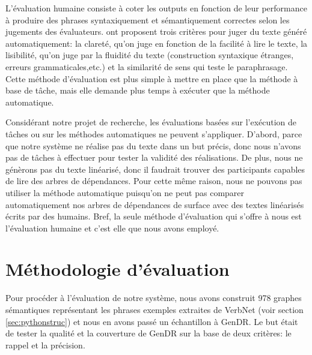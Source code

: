 L'évaluation humaine consiste à coter les outputs en fonction de leur performance à produire des phrases syntaxiquement et sémantiquement correctes selon les jugements des évaluateurs. \cite{BelzFirstSurfaceRealisation2011} ont proposent trois critères pour juger du texte généré automatiquement: la clareté, qu'on juge en fonction de la facilité à lire le texte, la lisibilité, qu'on juge par la fluidité du texte (construction syntaxique étranges, erreurs grammaticales,etc.) et la similarité de sens qui teste le paraphrasage. Cette méthode d'évaluation est plus simple à mettre en place que la méthode à base de tâche, mais elle demande plus temps à exécuter que la méthode automatique.
 
Considérant notre projet de recherche, les évaluations basées sur l'exécution de tâches ou sur les méthodes automatiques ne peuvent s'appliquer. D'abord, parce que notre système ne réalise pas du texte dans un but précis, donc nous n'avons pas de tâches à effectuer pour tester la validité des réalisations. De plus, nous ne génèrons pas du texte linéarisé, donc il faudrait trouver des participants capables de lire des arbres de dépendances. Pour cette même raison, nous ne pouvons pas utiliser la méthode automatique puisqu'on ne peut pas comparer automatiquement nos arbres de dépendances de surface avec des textes linéarisés écrits par des humains. Bref, la seule méthode d'évaluation qui s'offre à nous est l'évaluation humaine et c'est elle que nous avons employé.

\section{Méthodologie d'évaluation}

Pour procéder à l'évaluation de notre système, nous avons construit 978 graphes sémantiques représentant les phrases exemples extraites de VerbNet (voir section \ref{sec:pythonstruc}) et nous en avons passé un échantillon à GenDR. Le but était de tester la qualité et la couverture de GenDR sur la base de deux critères: le rappel et la précision.

